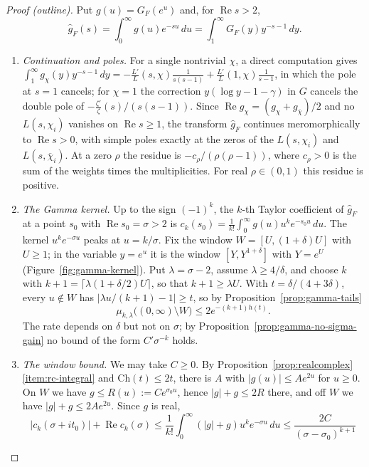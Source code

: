 \documentclass[11pt]{amsbook}
\theoremstyle{plain}
\theoremstyle{definition}
\theoremstyle{remark}
\numberwithin{equation}{section}
\numberwithin{figure}{chapter}
\numberwithin{table}{chapter}
\newcommand{\Ch}{\mathrm{Ch}}
\begin{document}
\begin{proof}[Proof (outline)]
Put $g(u)=G_F(e^u)$ and, for $\operatorname{Re}s>2$,
\[
\widehat g_F(s)=\int_0^\infty g(u)e^{-su}\,du
=\int_1^\infty G_F(y)y^{-s-1}\,dy .
\]
\begin{enumerate}[label=(\arabic*)]
\item \emph{Continuation and poles.} For a single nontrivial $\chi$, a
direct computation gives
$\int_1^\infty g_\chi(y)y^{-s-1}\,dy=-\frac{L'}{L}(s,\chi)
\frac{1}{s(s-1)}+\frac{L'}{L}(1,\chi)\frac1{s-1}$, in which the
pole at $s=1$ cancels; for $\chi=1$ the correction
$y(\log y-1-\gamma)$ in $G$ cancels the double pole of
$-\frac{\zeta'}{\zeta}(s)/(s(s-1))$. Since
$\operatorname{Re}g_\chi=(g_\chi+g_{\overline\chi})/2$ and no
$L(s,\chi_i)$ vanishes on $\operatorname{Re}s\ge1$, the transform
$\widehat g_F$ continues meromorphically to $\operatorname{Re}s>0$,
with simple poles exactly at the zeros of the $L(s,\chi_i)$ and
$L(s,\overline\chi_i)$. At a zero $\rho$ the residue is
$-c_\rho/(\rho(\rho-1))$, where $c_\rho>0$ is the sum of the weights
times the multiplicities. For real $\rho\in(0,1)$ this residue is
positive.
\item \emph{The Gamma kernel.} Up to the sign $(-1)^k$, the $k$-th
Taylor coefficient of $\widehat g_F$ at a point $s_0$ with
$\operatorname{Re}s_0=\sigma>2$ is
$c_k(s_0)=\frac1{k!}\int_0^\infty g(u)u^ke^{-s_0u}\,du$. The
kernel $u^ke^{-\sigma u}$ peaks at $u=k/\sigma$. Fix the window
$W=[U,(1+\delta)U]$ with $U\ge1$; in the variable $y=e^u$ it is the
window $[Y,Y^{1+\delta}]$ with $Y=e^U$
(Figure~\ref{fig:gamma-kernel}). Put $\lambda=\sigma-2$, assume
$\lambda\ge4/\delta$, and choose $k$ with
$k+1=\lceil\lambda(1+\delta/2)U\rceil$, so that $k+1\ge\lambda U$.
With $t=\delta/(4+3\delta)$, every $u\notin W$ has
$|\lambda u/(k+1)-1|\ge t$, so by Proposition~\ref{prop:gamma-tails}
\[
\mu_{k,\lambda}\bigl((0,\infty)\setminus W\bigr)\le
2e^{-(k+1)h(t)} .
\]
The rate depends on $\delta$ but not on $\sigma$; by
Proposition~\ref{prop:gamma-no-sigma-gain} no bound of the form
$C'\sigma^{-k}$ holds.
\item\label{item:landau-s3}
\emph{The window bound.} We may take $C\ge0$. By
Proposition~\ref{prop:realcomplex}\ref{item:rc-integral} and
$\Ch(t)\le2t$, there is $A$ with $|g(u)|\le Ae^{2u}$ for $u\ge0$.
On $W$ we have $g\le R(u):=Ce^{\sigma_0u}$, hence
$|g|+g\le2R$ there, and off $W$ we have $|g|+g\le2Ae^{2u}$. Since
$g$ is real,
\[
|c_k(\sigma+it_0)|+\operatorname{Re}c_k(\sigma)
\le\frac1{k!}\int_0^\infty(|g|+g)u^ke^{-\sigma u}\,du
\le\frac{2C}{(\sigma-\sigma_0)^{k+1}}
\]
\end{enumerate}
\end{proof}
\end{document}
